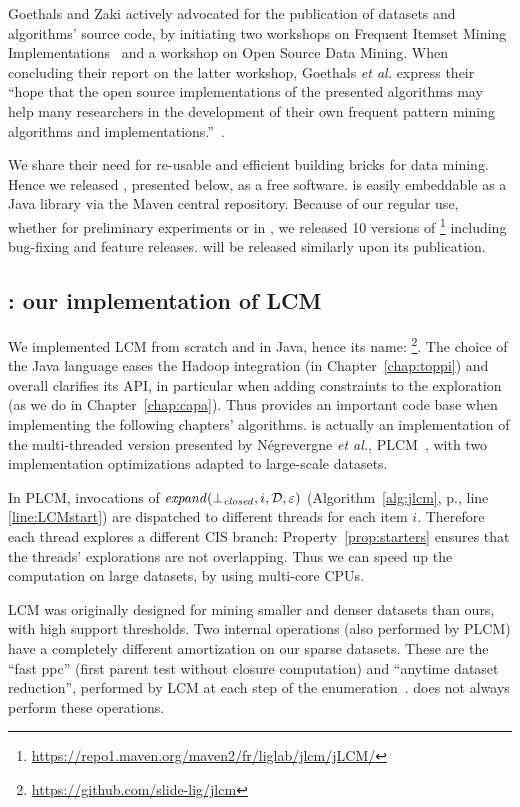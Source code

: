 Goethals and Zaki actively advocated for the publication of datasets and algorithms' source code,
by initiating two workshops on Frequent Itemset Mining Implementations~\cite{FIMI03,FIMI04}
and a workshop on Open Source Data Mining.
When concluding their report on the latter workshop,
Goethals {\em et al.} express their
``hope that the open source implementations of the presented algorithms may help many
researchers in the development of their own frequent pattern
mining algorithms and implementations.''~\cite{OSDM05}.

We share their need for re-usable and efficient building bricks for data mining.
Hence we released \jlcm, presented below, as a free software.
\jlcm is easily embeddable as a Java library via the Maven central repository.
Because of our regular use,
whether for preliminary experiments or in \capa,
we released 10 versions of \jlcm\footnote{\url{https://repo1.maven.org/maven2/fr/liglab/jlcm/jLCM/}}
including bug-fixing and feature releases.
\toppi will be released similarly upon its publication.



\subsection{\jlcm: our implementation of LCM}
\label{sec:jlcm}

We implemented LCM from scratch and in Java,
hence its name: \jlcm\footnote{\url{https://github.com/slide-lig/jlcm}}.
The choice of the Java language eases the Hadoop integration (in Chapter~\ref{chap:toppi}) and overall clarifies its API,
in particular when adding constraints to the exploration (as we do in Chapter~\ref{chap:capa}).
Thus \jlcm provides an important code base when implementing the following chapters' algorithms.
\jlcm is actually an implementation of the multi-threaded version presented by Négrevergne {\em et al.}, PLCM~\cite{NegrevergneHPCS10},
with two implementation optimizations adapted to large-scale datasets.

In PLCM,
invocations of $\mathit{expand}(\bot_{\mathit{closed}},i,{\cal D},\varepsilon)$
(Algorithm~\ref{alg:jlcm}, p.\pageref{alg:jlcm}, line \ref{line:LCMstart})
are dispatched to different threads for each item $i$.
Therefore each thread explores a different CIS branch:
Property~\ref{prop:starters} ensures that the threads' explorations are not overlapping.
Thus we can speed up the computation on large datasets, by using multi-core CPUs.

LCM was originally designed for mining smaller and denser datasets than ours, with high support thresholds.
Two internal operations (also performed by PLCM) have a completely different amortization on our sparse datasets.
These are the ``fast ppc'' (first parent test without closure computation) and ``anytime dataset reduction'',
performed by LCM at each step of the enumeration~\cite{UnoFIMI04}.
\jlcm does not always perform these operations.

